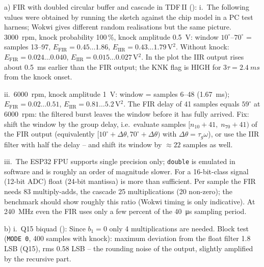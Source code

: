 \begin{solution}
a) FIR with doubled circular buffer and cascade in TDF\,II
():
i.\ The following values were obtained by running the sketch against the
chip model in a PC test harness; Wokwi gives different random realisations but
the same picture. \SI{3000}{rpm}, knock probability 100\,\%, knock amplitude
\SI{0.5}{V}: window $10^\circ$--$70^\circ$ = samples 13--97,
$E_\text{FIR}=0.45\dots1.86$, $E_\text{IIR}=0.43\dots1.79$\,V$^2$. Without knock:
$E_\text{FIR}=0.024\dots0.040$, $E_\text{IIR}=0.015\dots0.027$\,V$^2$. In the plot
the IIR output rises about \SI{0.5}{ms} earlier than the FIR output; the KNK flag
is HIGH for $3\tau=\SI{2.4}{ms}$ from the knock onset.

ii.\ \SI{6000}{rpm}, knock amplitude \SI{1}{V}: window = samples 6--48
(\SI{1.67}{ms}); $E_\text{FIR}=0.02\dots0.51$, $E_\text{IIR}=0.81\dots5.2$\,V$^2$.
The FIR delay of 41 samples equals $59^\circ$ at \SI{6000}{rpm}: the filtered burst
leaves the window before it has fully arrived. Fix: shift the window by the group
delay, i.e.\ evaluate samples $[n_{10}+41,\;n_{70}+41)$ of the FIR output
(equivalently $[10^\circ+\Delta\theta,70^\circ+\Delta\theta)$ with
$\Delta\theta=\tau_g\omega$), or use the IIR filter with half the delay -- and
shift its window by $\approx 22$ samples as well.

iii.\ The ESP32 FPU supports single precision only; \texttt{double} is emulated
in software and is roughly an order of magnitude slower. For a 16-bit-class signal
(12-bit ADC) float (24-bit mantissa) is more than sufficient. Per sample the FIR
needs 83 multiply-adds, the cascade 25 multiplications (20 non-zero); the
benchmark should show roughly this ratio (Wokwi timing is only indicative).
At \SI{240}{MHz} even the FIR uses only a few percent of the \SI{40}{\micro s}
sampling period.

b) i.\ Q15 biquad ():
Since $b_1=0$ only 4 multiplications are needed. Block test (\texttt{MODE 0},
400 samples with knock): maximum deviation from the float filter 1.8 LSB
(Q15), rms 0.58 LSB -- the rounding noise of the output, slightly amplified by
the recursive part.


\end{solution}
